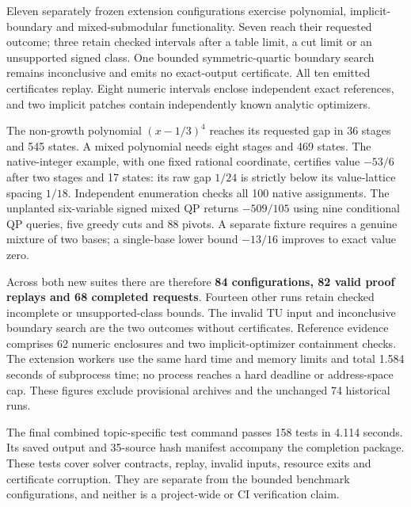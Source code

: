 Eleven separately frozen extension configurations exercise polynomial,
implicit-boundary and mixed-submodular functionality. Seven reach their
requested outcome; three retain checked intervals after a table limit,
a cut limit or an unsupported signed class. One bounded symmetric-quartic
boundary search remains inconclusive and emits no exact-output certificate.
All ten emitted certificates replay. Eight numeric intervals enclose
independent exact references, and two implicit patches contain independently
known analytic optimizers.

The non-growth polynomial $(x-1/3)^4$ reaches its requested gap in
36 stages and 545 states. A mixed polynomial needs eight stages and
469 states. The native-integer example, with one fixed rational coordinate,
certifies value $-53/6$ after two stages and 17 states: its raw gap $1/24$
is strictly below its value-lattice spacing $1/18$. Independent enumeration
checks all 100 native assignments. The unplanted six-variable signed mixed
QP returns $-509/105$ using nine conditional QP queries, five greedy cuts
and 88 pivots. A separate fixture requires a genuine mixture of two bases;
a single-base lower bound $-13/16$ improves to exact value zero.

Across both new suites there are therefore \textbf{84 configurations,
82 valid proof replays and 68 completed requests}. Fourteen other runs
retain checked incomplete or unsupported-class bounds. The invalid TU
input and inconclusive boundary search are the two outcomes without
certificates. Reference evidence comprises 62 numeric enclosures and two
implicit-optimizer containment checks. The extension workers use the same
hard time and memory limits and total 1.584 seconds of subprocess time;
no process reaches a hard deadline or address-space cap. These figures
exclude provisional archives and the unchanged 74 historical runs.

The final combined topic-specific test command passes 158 tests in
4.114 seconds. Its saved output and 35-source hash manifest accompany the
completion package. These tests cover solver contracts, replay, invalid
inputs, resource exits and certificate corruption. They are separate from
the bounded benchmark configurations, and neither is a project-wide or
CI verification claim.
